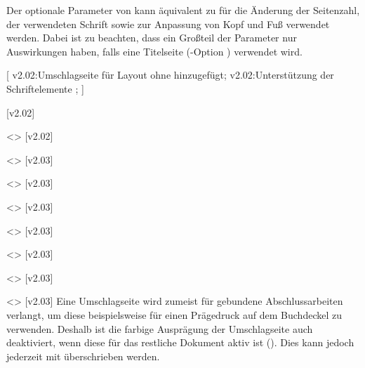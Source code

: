 \begin{DeclareEntity*}{}
\begin{DeclareEntity*}{}
\begin{DeclareEntity*}{}
\begin{Declaration}
Der optionale Parameter von  kann äquivalent zu 
 für die Änderung der Seitenzahl, der verwendeten Schrift 
sowie zur Anpassung von Kopf und Fuß verwendet werden. Dabei ist zu beachten, 
dass ein Großteil der Parameter nur Auswirkungen haben, falls eine Titelseite
(\KOMAScript-Option ) verwendet wird.
\end{Declaration}

\begin{Declaration}
  {}
  [
    v2.02:Umschlagseite für Layout ohne \CD hinzugefügt;
    v2.02:Unterstützung der Schriftelemente ;
  ]
\begin{Declaration}
  {}
  [v2.02]
\begin{Declaration}
  {}
\begin{Declaration}
  {}
  <>
  [v2.02]
\begin{Declaration}
  {}
  <>
  [v2.03]
\begin{Declaration}
  {}
  <>
  [v2.03]
\begin{Declaration}
  {}
  <>
  [v2.03]
\begin{Declaration}
  {}
  <>
  [v2.03]
\begin{Declaration}
  {}
  <>
  [v2.03]
\begin{Declaration}
  {}
  <>
  [v2.03]
\begin{Declaration}
  {}
  <>
  [v2.03]
%
Eine Umschlagseite wird zumeist für gebundene Abschlussarbeiten verlangt, um 
diese beispielsweise für einen Prägedruck auf dem Buchdeckel zu verwenden. 
Deshalb ist die farbige Ausprägung der Umschlagseite auch deaktiviert, wenn 
diese für das restliche Dokument aktiv ist (). Dies kann 
jedoch jederzeit mit  überschrieben werden.


\end{Declaration}
\end{Declaration}
\end{Declaration}
\end{Declaration}
\end{Declaration}
\end{Declaration}
\end{Declaration}
\end{Declaration}
\end{Declaration}
\end{Declaration}
\end{Declaration}
\end{DeclareEntity*}
\end{DeclareEntity*}
\end{DeclareEntity*}
